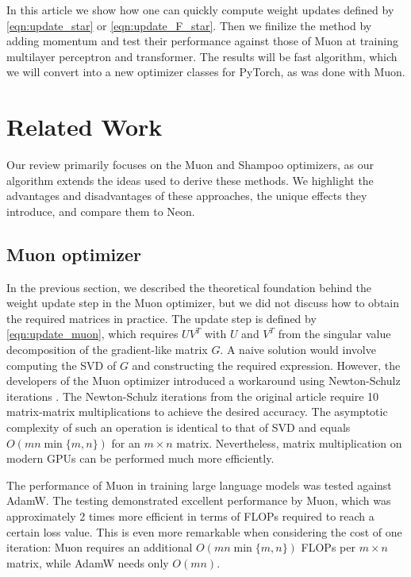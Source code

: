 \documentclass{article} %
\begin{document}
In this article we show how one can quickly compute weight updates defined by \eqref{eqn:update_star} or \eqref{eqn:update_F_star}. Then we finilize the method by adding momentum and test their performance against those of Muon at training multilayer perceptron and transformer. The results will be fast algorithm, which we will convert into a new optimizer classes for PyTorch, as was done with Muon.

\section{Related Work}
Our review primarily focuses on the Muon and Shampoo optimizers, as our algorithm extends the ideas used to derive these methods. We highlight the advantages and disadvantages of these approaches, the unique effects they introduce, and compare them to Neon.

\subsection{Muon optimizer}

In the previous section, we described the theoretical foundation behind the weight update step in the Muon optimizer, but we did not discuss how to obtain the required matrices in practice. The update step is defined by \eqref{eqn:update_muon}, which requires $UV^T$ with $U$ and $V^T$ from the singular value decomposition of the gradient-like matrix $G$. A naive solution would involve computing the SVD of $G$ and constructing the required expression. However, the developers of the Muon optimizer introduced a workaround using Newton-Schulz iterations \cite{jordan2024muon}. The Newton-Schulz iterations from the original article \cite{jordan2024muon} require 10 matrix-matrix multiplications to achieve the desired accuracy. The asymptotic complexity of such an operation is identical to that of SVD and equals $O(mn \min\{m, n\})$ for an $m \times n$ matrix. Nevertheless, matrix multiplication on modern GPUs can be performed much more efficiently.

The performance of Muon in training large language models was tested \cite{liu2025muon} against AdamW. The testing demonstrated excellent performance by Muon, which was approximately 2 times more efficient in terms of FLOPs required to reach a certain loss value. This is even more remarkable when considering the cost of one iteration: Muon requires an additional $O(mn \min\{m, n\})$ FLOPs per $m \times n$ matrix, while AdamW needs only $O(mn)$.
\end{document}
